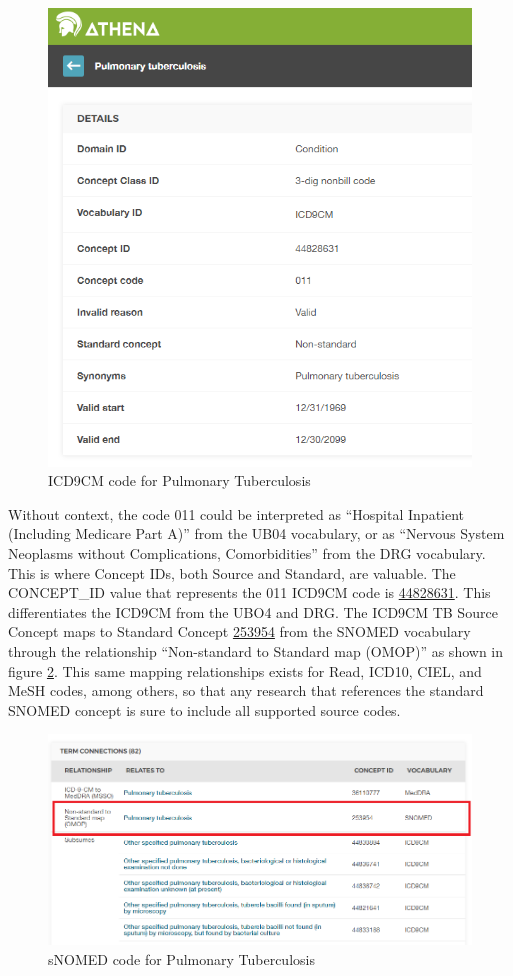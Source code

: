 \documentclass[11pt]{book}
\theoremstyle{definition}
\theoremstyle{definition}
\theoremstyle{definition}
\theoremstyle{remark}
\begin{document}
\begin{figure}

{\centering \includegraphics[width=0.75\linewidth]{images/CommonDataModel/pulmTubICD9} 

}

\caption{ICD9CM code for Pulmonary Tuberculosis}\label{fig:pulmTubICD9}
\end{figure}

Without context, the code 011 could be interpreted as ``Hospital Inpatient (Including Medicare Part A)'' from the UB04 vocabulary, or as ``Nervous System Neoplasms without Complications, Comorbidities'' from the DRG vocabulary. This is where Concept IDs, both Source and Standard, are valuable. The CONCEPT\_ID value that represents the 011 ICD9CM code is \href{http://athena.ohdsi.org/search-terms/terms/44828631}{44828631}. This differentiates the ICD9CM from the UBO4 and DRG. The ICD9CM TB Source Concept maps to Standard Concept \href{http://athena.ohdsi.org/search-terms/terms/253954}{253954} from the SNOMED vocabulary through the relationship ``Non-standard to Standard map (OMOP)'' as shown in figure \ref{fig:pulmTubMap}. This same mapping relationships exists for Read, ICD10, CIEL, and MeSH codes, among others, so that any research that references the standard SNOMED concept is sure to include all supported source codes.

\begin{figure}
\includegraphics[width=1\linewidth]{images/CommonDataModel/pulmTubMap} \caption{sNOMED code for Pulmonary Tuberculosis}\label{fig:pulmTubMap}
\end{figure}
\end{document}
